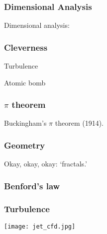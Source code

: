 \begin{frame}
  \frametitle{Dimensional Analysis}

  Dimensional analysis:

\end{frame}

\begin{frame}
  \frametitle{Cleverness}

  Turbulence

  Atomic bomb

\end{frame}

\begin{frame}
  \frametitle{$\pi$ theorem}

  Buckingham's $\pi$ theorem (1914).




\end{frame}

\begin{frame}
  \frametitle{Geometry}

  Okay, okay, okay: `fractals.'


\end{frame}

\begin{frame}
  \frametitle{Benford's law}

\end{frame}

\begin{frame}
  \frametitle{Turbulence}


  \texttt{[image: jet\_cfd.jpg]}


\end{frame}

